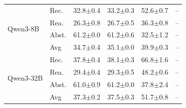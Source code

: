 \begin{table}[t]
\begin{tabular}{@{}ll | c c | c c @{}}
\midrule
\multirow{4}{*}{Qwen3-8B} & Rec. & 32.8{\scriptsize$\pm$0.4} & 33.2{\scriptsize$\pm$0.3} & 52.6{\scriptsize$\pm$0.7} & -- \\
 & Rea. & 26.3{\scriptsize$\pm$0.8} & 26.7{\scriptsize$\pm$0.5} & 36.3{\scriptsize$\pm$0.8} & -- \\
 & Abst. & 61.2{\scriptsize$\pm$0.0} & 61.2{\scriptsize$\pm$0.6} & 32.5{\scriptsize$\pm$1.2} & -- \\
 & Avg & 34.7{\scriptsize$\pm$0.4} & 35.1{\scriptsize$\pm$0.0} & 39.9{\scriptsize$\pm$0.3} & -- \\
\midrule
\multirow{4}{*}{Qwen3-32B} & Rec. & 37.8{\scriptsize$\pm$0.4} & 38.1{\scriptsize$\pm$0.3} & 66.8{\scriptsize$\pm$1.6} & -- \\
 & Rea. & 29.4{\scriptsize$\pm$0.4} & 29.3{\scriptsize$\pm$0.5} & 48.2{\scriptsize$\pm$0.6} & -- \\
 & Abst. & 61.0{\scriptsize$\pm$0.9} & 61.2{\scriptsize$\pm$0.0} & 37.8{\scriptsize$\pm$2.4} & -- \\
 & Avg & 37.3{\scriptsize$\pm$0.2} & 37.5{\scriptsize$\pm$0.3} & 51.7{\scriptsize$\pm$0.8} & -- \\
\bottomrule
\end{tabular}
\vspace{-6pt}
\end{table}
